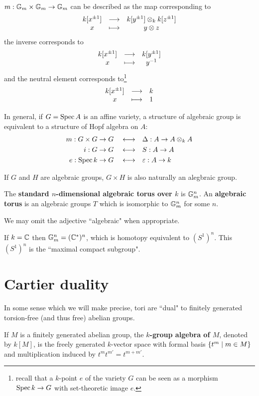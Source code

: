 \begin{example}
$m:\mathbb{G}_m\times \mathbb{G}_m\to \mathbb{G}_m$ can be described as the map corresponding to
\[\begin{array}{ccc} {k[x^{\pm1}]} & \longrightarrow & {k[y^{\pm1}]\otimes_k k[z^{\pm1}]}\\ {x} & \longmapsto & {y\otimes z} \end{array}\]
the inverse corresponds to
\[\begin{array}{ccc} {k[x^{\pm1}]} & \longrightarrow & {k[y^{\pm1}]}\\ {x} & \longmapsto & {y^{-1}} \end{array}\]
and the neutral element corresponds to\footnote{recall that a $k$-point $e$ of the variety $G$ can be seen as a morphism $\operatorname{Spec} k\to G$ with set-theoretic image $e$.}
\[\begin{array}{ccc} {k[x^{\pm1}]} & \longrightarrow & {k}\\ {x} & \longmapsto & {1} \end{array}\]
\end{example}

\begin{remark}
In general, if $G=\operatorname{Spec} A$ is an affine variety, a structure of algebraic group is equivalent to a structure of Hopf algebra on $A$:
\begin{align*}
m:G\times G\to G\quad\longleftrightarrow& \quad\Delta:A\to A\otimes_k A\\
i:G\to G\quad\longleftrightarrow& \quad S:A\to  A\\
e:\operatorname{Spec} k\to G\quad\longleftrightarrow& \quad\varepsilon:A\to k
\end{align*}
\end{remark}

\begin{remark}
If $G$ and $H$ are algebraic groups, $G\times H$ is also naturally an alegbraic group.
\end{remark}

\begin{definition}
The \textbf{standard $n$-dimensional algebraic torus over $k$} is $\mathbb{G}_m^n$. An \textbf{algebraic torus} is an algebraic groups $T$ which is isomorphic to $\mathbb{G}_m^n$ for some $n$.

We may omit the adjective ``algebraic" when appropriate.
\end{definition}

\begin{remark}
If $k=\mathbb{C}$ then $\mathbb{G}_m^n=(\mathbb{C}^\ast)^n$, which is homotopy equivalent to $(S^1)^n$. This $(S^1)^n$ is the ``maximal compact subgroup".
\end{remark}


\section{Cartier duality}

In some sense which we will make precise, tori are ``dual" to finitely generated torsion-free (and thus free) abelian groups.

\begin{definition}
If $M$ is a finitely generated abelian group, the \textbf{$k$-group algebra of $M$}, denoted by $k[M]$, is the freely generated $k$-vector space with formal basis $\left\{{t^m\mid m\in M}\right\}$ and multiplication induced by $t^mt^{m'}=t^{m+m'}$.
\end{definition}


